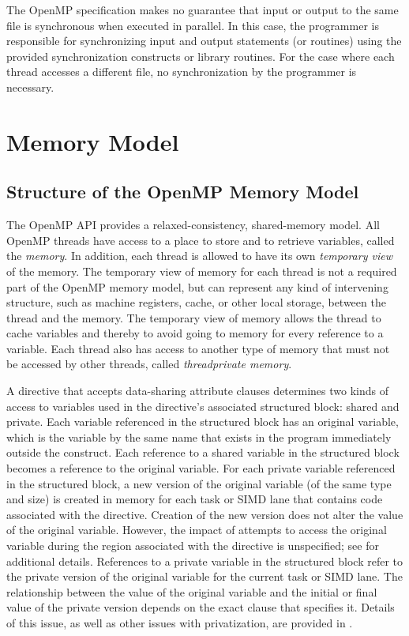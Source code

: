 The OpenMP specification makes no guarantee that input or output to the same file is 
synchronous when executed in parallel. In this case, the programmer is responsible for 
synchronizing input and output statements (or routines) using the provided 
synchronization constructs or library routines. For the case where each thread accesses a 
different file, no synchronization by the programmer is necessary.








\section{Memory Model}
\label{sec:Memory Model}
\subsection{Structure of the OpenMP Memory Model}
\label{subsec:Structure of the OpenMP Memory Model}
The OpenMP API provides a relaxed-consistency, shared-memory model. All OpenMP
threads have access to a place to store and to retrieve variables, 
called the \emph{memory}. In
addition, each thread is allowed to have its own \emph{temporary view} of the memory. The
temporary view of memory for each thread is not a required part of the OpenMP
memory model, but can represent any kind of intervening structure, such as machine
registers, cache, or other local storage, between the thread and the memory. The
temporary view of memory allows the thread to cache variables and thereby to avoid
going to memory for every reference to a variable. Each thread also has access to
another type of memory that must not be accessed by other threads, 
called \emph{threadprivate memory}.

A directive that accepts data-sharing attribute clauses determines two kinds of access to
variables used in the directive's associated structured block: shared and private. Each
variable referenced in the structured block has an original variable, which is the variable  
by the same name that exists in the program immediately outside the construct. Each
reference to a shared variable in the structured block becomes a reference to the original 
variable. For each private variable referenced in the structured block, a new version of
the original variable (of the same type and size) is created in memory for each task or
SIMD lane that contains code associated with the directive. Creation of the new version
does not alter the value of the original variable. However, the impact of attempts to
access the original variable during the region associated with the directive is
unspecified; see  for additional details. References to a
private variable in the structured block refer to the private version of the original
variable for the current task or SIMD lane. The relationship between the value of the
original variable and the initial or final value of the private version depends on the exact
clause that specifies it. Details of this issue, as well as other issues with privatization,
are provided in .

